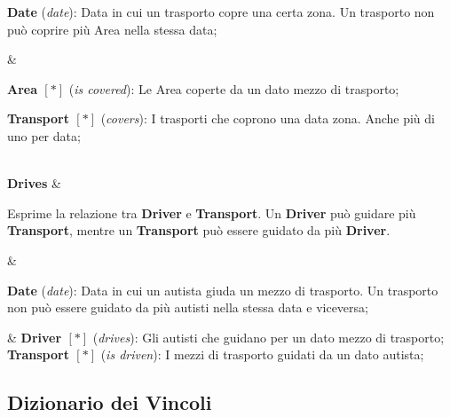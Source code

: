{{  \textbf{Date} (\textit{date}): Data in cui un trasporto copre una certa zona. Un trasporto non può coprire più Area nella stessa data; 
  
  } &
  {\footnotesize
  \textbf{Area \([*]\)} (\textit{is covered}): Le Area coperte da un dato mezzo di trasporto;

  \textbf{Transport \([*]\)} (\textit{covers}): I trasporti che coprono una data zona. Anche più di uno per data;
  }\\

  \textbf{Drives} &
  {\footnotesize
  Esprime la relazione tra \textbf{Driver} e \textbf{Transport}. Un \textbf{Driver} può guidare più \textbf{Transport}, mentre un \textbf{Transport} può essere guidato da più \textbf{Driver}.
  
  } &
  {\footnotesize

  \textbf{Date} (\textit{date}): Data in cui un autista giuda un mezzo di trasporto. Un trasporto non può essere guidato da più autisti nella stessa data e viceversa; 
  
  } &
  {\footnotesize
  \textbf{Driver \([*]\)} (\textit{drives}): Gli autisti che guidano per un dato mezzo di trasporto; 
  \textbf{Transport \([*]\)} (\textit{is driven}): I mezzi di trasporto guidati da un dato autista;
  }\\
}

\subsection{Dizionario dei Vincoli}\label{ConstraintDictionary}

